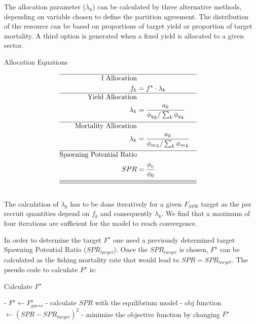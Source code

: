 \documentclass[12pt,letterpaper]{article}
\begin{document}
The allocation parameter ($\lambda_k$) can be calculated by three alternative methods, depending on variable chosen to define the partition agreement. The distribution of the resource can be based on proportions of target yield or proportion of target mortality. A third option is generated when a fixed yield is allocated to a given sector.


\begin{table}[h!]
\centering
\caption{Allocation Equations}\label{tab:allocation} 
\tableEq
	\large
    \begin{align}
    \hline
    	\mbox{f Allocation} \nonumber \\
		        	f_{k} &=  f^{\star} \cdot \lambda_{k}  \label{T3.13}\\ 
		\hline        	
		\mbox{Yield Allocation} \nonumber \\
					\lambda_k &= \dfrac{a_k}{{\phi_q}_k / \sum_k {\phi_q}_k } \label{T3.1}\\[1ex]
		\hline 
		\mbox{Mortality Allocation} \nonumber \\
					\lambda_k &= \dfrac{a_k}{{\phi_m}_k / \sum_k {\phi_m}_k } \label{T3.2}\\[1ex]
		\hline 
		\mbox{Spawning Potential Ratio} \nonumber \\
					SPR &= \dfrac{\phi_{e}}{\phi_{0}} \label{T3.3}\\[1ex]
\hline
\hline \hline \nonumber   
   \end{align}
\end{table}

The calculation of $\lambda_k$ has to be done iteratively for a given $F_{SPR}$ target as the per recruit quantities depend on $f_k$ and consequently $\lambda_k$. We find that a maximum of four iterations are sufficient for the model to reach convergence.  

In order to determine the target $F^{\star}$ one need a previously determined target Spawning Potential Ratio (${SPR}_{target}$). Once the ${SPR}_{target}$ is chosen, $F^{\star}$ can be calculated as the fishing mortality rate that would lead to $SPR = {SPR}_{target}$. The pseudo code to calculate $F^{\star}$ is: 


\begin{algorithm} 
\caption{Calculate $F^{\star}$}
\begin{algorithmic} 
 - $F^{\star} \leftarrow F^{\star}_{guess}$
 - calculate $SPR$ with the equilibrium model
 - obj function $\leftarrow (SPR-SPR_{target})^2$
 - minimize the objective function by changing $F^{\star}$
\end{algorithmic}
\end{algorithm}
\end{document}
